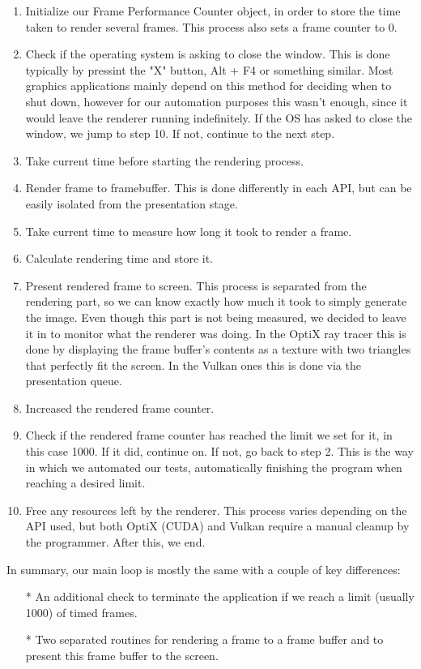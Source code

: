 \begin{enumerate}
  \item Initialize our Frame Performance Counter object, in order to store the time taken to render several frames. This process also sets a frame counter to 0.
  \item Check if the operating system is asking to close the window. This is done typically by pressint the "X" button, Alt + F4 or something similar. Most graphics applications mainly depend on this method for deciding when to shut down, however for our automation purposes this wasn't enough, since it would leave the renderer running indefinitely. If the OS has asked to close the window, we jump to step 10. If not, continue to the next step.
  \item Take current time before starting the rendering process.
  \item Render frame to framebuffer. This is done differently in each API, but can be easily isolated from the presentation stage.
  \item Take current time to measure how long it took to render a frame.
  \item Calculate rendering time and store it.
  \item Present rendered frame to screen. This process is separated from the rendering part, so we can know exactly how much it took to simply generate the image. Even though this part is not being measured, we decided to leave it in to monitor what the renderer was doing. In the OptiX ray tracer this is done by displaying the frame buffer's contents as a texture with two triangles that perfectly fit the screen. In the Vulkan ones this is done via the presentation queue.
  \item Increased the rendered frame counter.
  \item Check if the rendered frame counter has reached the limit we set for it, in this case 1000. If it did, continue on. If not, go back to step 2. This is the way in which we automated our tests, automatically finishing the program when reaching a desired limit.
  \item Free any resources left by the renderer. This process varies depending on the API used, but both OptiX (CUDA) and Vulkan require a manual cleanup by the programmer. After this, we end.
\end{enumerate}

In summary, our main loop is mostly the same with a couple of key differences:
\begin{itemize}
  \item[*]{An additional check to terminate the application if we reach a limit (usually 1000) of timed frames.}
  \item[*]{Two separated routines for rendering a frame to a frame buffer and to present this frame buffer to the screen.}
\end{itemize}

